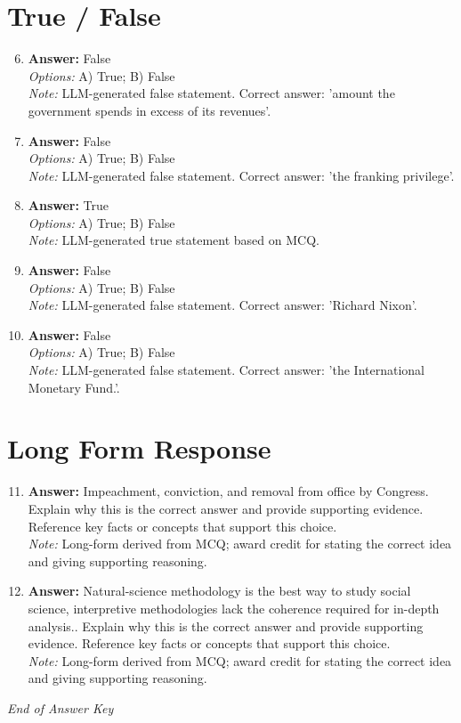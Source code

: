 \documentclass[12pt]{article}
\begin{document}
\section*{True / False}
\begin{enumerate}[label=\arabic*.]
\setcounter{enumi}{5}
\item \textbf{Answer:} False
\\ \textit{Options:} A) True; B) False
\\ \textit{Note:} LLM-generated false statement. Correct answer: 'amount the government spends in excess of its revenues'.
\item \textbf{Answer:} False
\\ \textit{Options:} A) True; B) False
\\ \textit{Note:} LLM-generated false statement. Correct answer: 'the franking privilege'.
\item \textbf{Answer:} True
\\ \textit{Options:} A) True; B) False
\\ \textit{Note:} LLM-generated true statement based on MCQ.
\item \textbf{Answer:} False
\\ \textit{Options:} A) True; B) False
\\ \textit{Note:} LLM-generated false statement. Correct answer: 'Richard Nixon'.
\item \textbf{Answer:} False
\\ \textit{Options:} A) True; B) False
\\ \textit{Note:} LLM-generated false statement. Correct answer: 'the International Monetary Fund.'.
\end{enumerate}

\section*{Long Form Response}
\begin{enumerate}[label=\arabic*.]
\setcounter{enumi}{10}
\item \textbf{Answer:} Impeachment, conviction, and removal from office by Congress. Explain why this is the correct answer and provide supporting evidence. Reference key facts or concepts that support this choice.
\\ \textit{Note:} Long-form derived from MCQ; award credit for stating the correct idea and giving supporting reasoning.
\item \textbf{Answer:} Natural-science methodology is the best way to study social science, interpretive methodologies lack the coherence required for in-depth analysis.. Explain why this is the correct answer and provide supporting evidence. Reference key facts or concepts that support this choice.
\\ \textit{Note:} Long-form derived from MCQ; award credit for stating the correct idea and giving supporting reasoning.
\end{enumerate}

\vfill
\noindent\textit{End of Answer Key}
\end{document}
